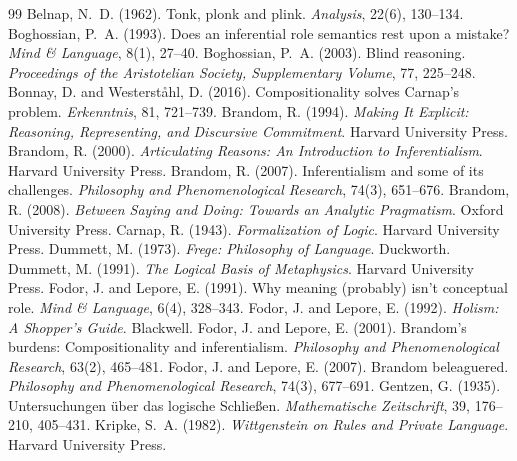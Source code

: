 \documentclass{situationist-preprint}
\begin{document}
\begin{thebibliography}{99}\small
{} Belnap, N.~D. (1962). Tonk, plonk and plink. \emph{Analysis}, 22(6), 130--134.
 Boghossian, P.~A. (1993). Does an inferential role semantics rest upon a mistake? \emph{Mind \& Language}, 8(1), 27--40.
 Boghossian, P.~A. (2003). Blind reasoning. \emph{Proceedings of the Aristotelian Society, Supplementary Volume}, 77, 225--248.
 Bonnay, D. and Westerst{\aa}hl, D. (2016). Compositionality solves Carnap's problem. \emph{Erkenntnis}, 81, 721--739.
 Brandom, R. (1994). \emph{Making It Explicit: Reasoning, Representing, and Discursive Commitment}. Harvard University Press.
 Brandom, R. (2000). \emph{Articulating Reasons: An Introduction to Inferentialism}. Harvard University Press.
 Brandom, R. (2007). Inferentialism and some of its challenges. \emph{Philosophy and Phenomenological Research}, 74(3), 651--676.
 Brandom, R. (2008). \emph{Between Saying and Doing: Towards an Analytic Pragmatism}. Oxford University Press.
 Carnap, R. (1943). \emph{Formalization of Logic}. Harvard University Press.
 Dummett, M. (1973). \emph{Frege: Philosophy of Language}. Duckworth.
 Dummett, M. (1991). \emph{The Logical Basis of Metaphysics}. Harvard University Press.
 Fodor, J. and Lepore, E. (1991). Why meaning (probably) isn't conceptual role. \emph{Mind \& Language}, 6(4), 328--343.
 Fodor, J. and Lepore, E. (1992). \emph{Holism: A Shopper's Guide}. Blackwell.
 Fodor, J. and Lepore, E. (2001). Brandom's burdens: Compositionality and inferentialism. \emph{Philosophy and Phenomenological Research}, 63(2), 465--481.
 Fodor, J. and Lepore, E. (2007). Brandom beleaguered. \emph{Philosophy and Phenomenological Research}, 74(3), 677--691.
 Gentzen, G. (1935). Untersuchungen {\"u}ber das logische Schlie{\ss}en. \emph{Mathematische Zeitschrift}, 39, 176--210, 405--431.
 Kripke, S.~A. (1982). \emph{Wittgenstein on Rules and Private Language}. Harvard University Press.

\end{thebibliography}
\end{document}
